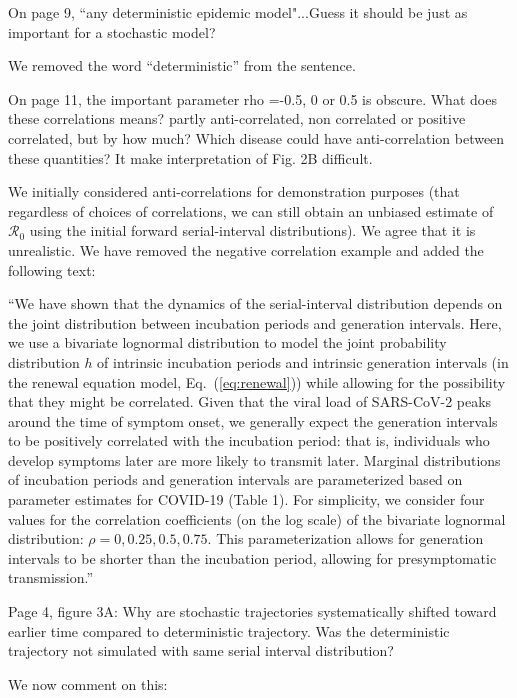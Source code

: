 \documentclass[12pt]{article}
\newcommand{\eref}[1]{Eq.~(\ref{eq:#1})}
\newcommand{\Ro}{\ensuremath{{\mathcal R}_{0}}\xspace}
\newcommand{\revtext}{\textsf}
\begin{document}
\revtext{On page 9, ``any deterministic epidemic model"...Guess it should be just as important for a stochastic model?}

We removed the word ``deterministic'' from the sentence.

\revtext{On page 11, the important parameter rho =-0.5, 0 or 0.5 is obscure. What does these correlations means? partly anti-correlated, non correlated or positive correlated, but by how much? Which disease could have anti-correlation between these quantities? It make interpretation of Fig. 2B difficult. }

We initially considered anti-correlations for demonstration purposes (that regardless of choices of correlations, we can still obtain an unbiased estimate of \Ro using the initial forward serial-interval distributions). We agree that it is unrealistic. We have removed the negative correlation example and added the following text:

``We have shown that the dynamics of the serial-interval distribution depends on the joint distribution between incubation periods and generation intervals.
Here, we use a bivariate lognormal distribution to model the joint probability distribution $h$ of intrinsic incubation periods and intrinsic generation intervals (in the renewal equation model, \eref{renewal}) while allowing for the possibility that they might be correlated.
Given that the viral load of SARS-CoV-2 peaks around the time of symptom onset, we generally expect the generation intervals to be positively correlated with the incubation period:
that is, individuals who develop symptoms later are more likely to transmit later.
Marginal distributions of incubation periods and generation intervals are parameterized based on parameter estimates for COVID-19 (Table 1).
For simplicity, we consider four values for the correlation coefficients (on the log scale) of the bivariate lognormal distribution: $\rho = 0, 0.25, 0.5, 0.75$.
This parameterization allows for generation intervals to be shorter than the incubation period, allowing for presymptomatic transmission.''

\revtext{Page 4, figure 3A: Why are stochastic trajectories systematically shifted toward earlier time compared to deterministic trajectory. Was the deterministic trajectory not simulated with same serial interval distribution?}

We now comment on this:
\end{document}
